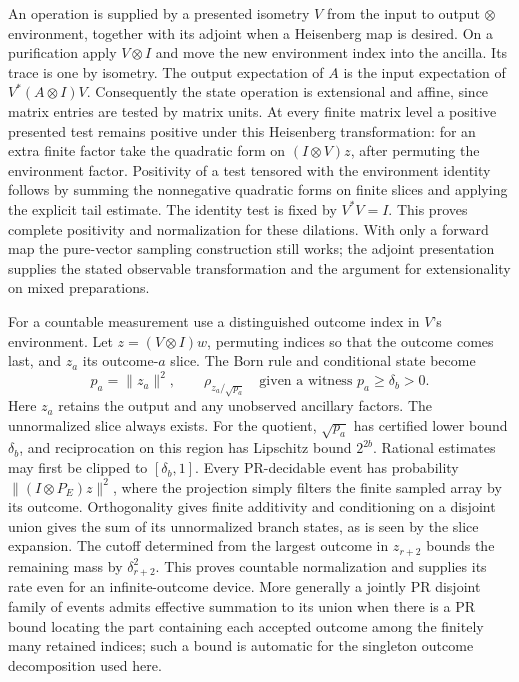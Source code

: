 An operation is supplied by a presented isometry $V$ from the input to
output $\otimes$ environment, together with its adjoint when a Heisenberg
map is desired. On a purification apply $V\otimes I$ and move the new
environment index into the ancilla. Its trace is one by isometry. The
output expectation of $A$ is the input expectation of
$V^*(A\otimes I)V$. Consequently the state operation is extensional
and affine, since matrix entries are tested by matrix units. At every
finite matrix level a positive presented test remains positive under
this Heisenberg transformation: for an extra finite factor take the
quadratic form on $(I\otimes V)z$, after permuting the environment
factor. Positivity of a test tensored with the environment identity
follows by summing the nonnegative quadratic forms on finite slices
and applying the explicit tail estimate. The identity test is fixed by
$V^*V=I$. This proves complete positivity and normalization for these
dilations. With only a forward map the pure-vector sampling construction
still works; the adjoint presentation supplies the stated observable
transformation and the argument for extensionality on mixed preparations.

For a countable measurement use a distinguished outcome index in $V$'s
environment. Let $z=(V\otimes I)w$, permuting indices so that the
outcome comes last, and $z_a$ its outcome-$a$ slice. The Born rule and
conditional state become
\[
   p_a=\|z_a\|^2,\qquad
   \rho_{z_a/\sqrt{p_a}}\quad\text{given a witness }p_a\ge\delta_b>0 .
\]
Here $z_a$ retains the output and any unobserved ancillary factors.
The unnormalized slice always exists. For the quotient, $\sqrt{p_a}$
has certified lower bound $\delta_b$, and reciprocation on this region
has Lipschitz bound $2^{2b}$. Rational estimates may first be clipped
to $[\delta_b,1]$. Every PR-decidable event has probability
$\|(I\otimes P_E)z\|^2$, where the projection simply filters the
finite sampled array by its outcome. Orthogonality gives finite
additivity and conditioning on a disjoint union gives the sum of its
unnormalized branch states, as is seen by the slice expansion. The
cutoff determined from the largest outcome in $z_{r+2}$ bounds the
remaining mass by $\delta_{r+2}^2$.
This proves countable normalization and supplies its rate even for
an infinite-outcome device. More generally a jointly PR disjoint family
of events admits effective summation to its union when there is a PR
bound locating the part containing each accepted outcome among the
finitely many retained indices; such a bound is automatic for the
singleton outcome decomposition used here.

